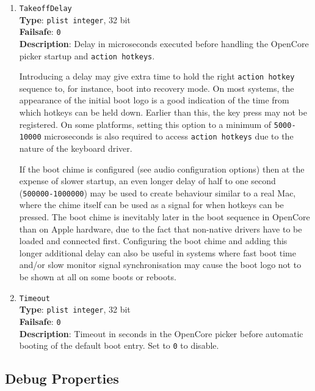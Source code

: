 \documentclass[]{article}
\begin{document}
\begin{enumerate}
\item
  \texttt{TakeoffDelay}\\
  \textbf{Type}: \texttt{plist\ integer}, 32 bit\\
  \textbf{Failsafe}: \texttt{0}\\
  \textbf{Description}: Delay in microseconds executed before handling
  the OpenCore picker startup and \texttt{action hotkeys}.

  Introducing a delay may give extra time to hold the right \texttt{action hotkey}
  sequence to, for instance, boot into recovery mode. On most systems, the appearance
  of the initial boot logo is a good indication of the time from which hotkeys can be
  held down. Earlier than this, the key press may not be registered. On some platforms,
  setting this option to a minimum of \texttt{5000-10000} microseconds is also required
  to access \texttt{action hotkeys} due to the nature of the keyboard driver.

  If the boot chime is configured (see audio configuration options) then at the expense
  of slower startup, an even longer delay of half to one second (\texttt{500000-1000000})
  may be used to create behaviour similar to a real Mac, where the chime itself can be used
  as a signal for when hotkeys can be pressed. The boot chime is inevitably later in the boot
  sequence in OpenCore than on Apple hardware, due to the fact that non-native drivers
  have to be loaded and connected first. Configuring the boot chime and adding this longer
  additional delay can also be useful in systems where fast boot time and/or slow monitor signal
  synchronisation may cause the boot logo not to be shown at all on some boots or reboots.

\item
  \texttt{Timeout}\\
  \textbf{Type}: \texttt{plist\ integer}, 32 bit\\
  \textbf{Failsafe}: \texttt{0}\\
  \textbf{Description}: Timeout in seconds in the OpenCore picker before
  automatic booting of the default boot entry. Set to \texttt{0} to disable.

\end{enumerate}

\subsection{Debug Properties}\label{miscdebugprops}
\end{document}
